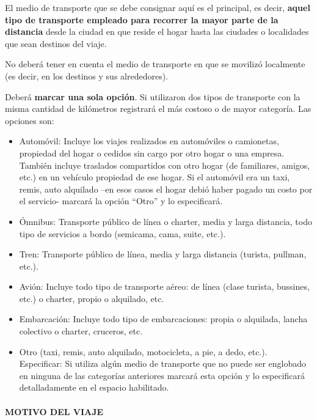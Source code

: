 \documentclass[
  openany]{book}
\begin{document}
El medio de transporte que se debe consignar aquí es el principal, es decir, \textbf{aquel tipo de transporte empleado para recorrer la mayor parte de la distancia} desde la ciudad en que reside el hogar hasta las ciudades o localidades que sean destinos del viaje.

No deberá tener en cuenta el medio de transporte en que se movilizó localmente (es decir, en los destinos y sus alrededores).

Deberá \textbf{marcar una sola opción}. Si utilizaron dos tipos de transporte con la misma cantidad de kilómetros registrará el más costoso o de mayor categoría. Las opciones son:

\begin{itemize}
\item
  Automóvil: Incluye los viajes realizados en automóviles o camionetas, propiedad del hogar o cedidos sin cargo por otro hogar o una empresa. También incluye traslados compartidos con otro hogar (de familiares, amigos, etc.) en un vehículo propiedad de ese hogar. Si el automóvil era un taxi, remis, auto alquilado --en esos casos el hogar debió haber pagado un costo por el servicio- marcará la opción ``Otro'' y lo especificará.
\item
  Ómnibus: Transporte público de línea o charter, media y larga distancia, todo tipo de servicios a bordo (semicama, cama, suite, etc.).
\item
  Tren: Transporte público de línea, media y larga distancia (turista, pullman, etc.).
\item
  Avión: Incluye todo tipo de transporte aéreo: de línea (clase turista, bussines, etc.) o charter, propio o alquilado, etc.
\item
  Embarcación: Incluye todo tipo de embarcaciones: propia o alquilada, lancha colectivo o charter, cruceros, etc.
\item
  Otro (taxi, remis, auto alquilado, motocicleta, a pie, a dedo, etc.). Especificar: Si utiliza algún medio de transporte que no puede ser englobado en ninguna de las categorías anteriores marcará esta opción y lo especificará detalladamente en el espacio habilitado.
\end{itemize}

\hypertarget{motivo-del-viaje}{%
\paragraph{\texorpdfstring{\textbf{MOTIVO DEL VIAJE}}{MOTIVO DEL VIAJE}}\label{motivo-del-viaje}}
\end{document}
